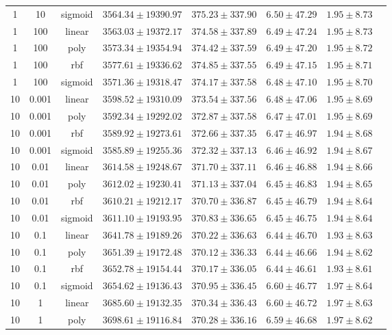 \begin{tabular}{cccrrrrr}
1 & 10 & sigmoid & $3564.34 \pm 19390.97$ & $375.23 \pm 337.90$ & $6.50 \pm 47.29$ & $1.95 \pm 8.73$\\
1 & 100 & linear & $3563.03 \pm 19372.17$ & $374.58 \pm 337.89$ & $6.49 \pm 47.24$ & $1.95 \pm 8.73$\\
1 & 100 & poly & $3573.34 \pm 19354.94$ & $374.42 \pm 337.59$ & $6.49 \pm 47.20$ & $1.95 \pm 8.72$\\
1 & 100 & rbf & $3577.61 \pm 19336.62$ & $374.85 \pm 337.55$ & $6.49 \pm 47.15$ & $1.95 \pm 8.71$\\
1 & 100 & sigmoid & $3571.36 \pm 19318.47$ & $374.17 \pm 337.58$ & $6.48 \pm 47.10$ & $1.95 \pm 8.70$\\
10 & 0.001 & linear & $3598.52 \pm 19310.09$ & $373.54 \pm 337.56$ & $6.48 \pm 47.06$ & $1.95 \pm 8.69$\\
10 & 0.001 & poly & $3592.34 \pm 19292.02$ & $372.87 \pm 337.58$ & $6.47 \pm 47.01$ & $1.95 \pm 8.69$\\
10 & 0.001 & rbf & $3589.92 \pm 19273.61$ & $372.66 \pm 337.35$ & $6.47 \pm 46.97$ & $1.94 \pm 8.68$\\
10 & 0.001 & sigmoid & $3585.89 \pm 19255.36$ & $372.32 \pm 337.13$ & $6.46 \pm 46.92$ & $1.94 \pm 8.67$\\
10 & 0.01 & linear & $3614.58 \pm 19248.67$ & $371.70 \pm 337.11$ & $6.46 \pm 46.88$ & $1.94 \pm 8.66$\\
10 & 0.01 & poly & $3612.02 \pm 19230.41$ & $371.13 \pm 337.04$ & $6.45 \pm 46.83$ & $1.94 \pm 8.65$\\
10 & 0.01 & rbf & $3610.21 \pm 19212.17$ & $370.70 \pm 336.87$ & $6.45 \pm 46.79$ & $1.94 \pm 8.64$\\
10 & 0.01 & sigmoid & $3611.10 \pm 19193.95$ & $370.83 \pm 336.65$ & $6.45 \pm 46.75$ & $1.94 \pm 8.64$\\
10 & 0.1 & linear & $3641.78 \pm 19189.26$ & $370.22 \pm 336.63$ & $6.44 \pm 46.70$ & $1.93 \pm 8.63$\\
10 & 0.1 & poly & $3651.39 \pm 19172.48$ & $370.12 \pm 336.33$ & $6.44 \pm 46.66$ & $1.94 \pm 8.62$\\
10 & 0.1 & rbf & $3652.78 \pm 19154.44$ & $370.17 \pm 336.05$ & $6.44 \pm 46.61$ & $1.93 \pm 8.61$\\
10 & 0.1 & sigmoid & $3654.62 \pm 19136.43$ & $370.95 \pm 336.45$ & $6.60 \pm 46.77$ & $1.97 \pm 8.64$\\
10 & 1 & linear & $3685.60 \pm 19132.35$ & $370.34 \pm 336.43$ & $6.60 \pm 46.72$ & $1.97 \pm 8.63$\\
10 & 1 & poly & $3698.61 \pm 19116.84$ & $370.28 \pm 336.16$ & $6.59 \pm 46.68$ & $1.97 \pm 8.62$\\

\end{tabular}
